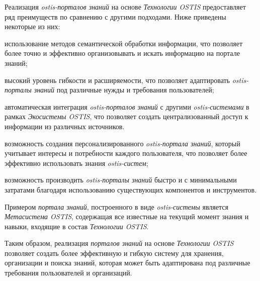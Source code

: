 Реализация \textit{ostis-порталов знаний} на основе \textit{Технологии OSTIS} предоставляет ряд преимуществ по сравнению с другими подходами. Ниже приведены некоторые из них:
\begin{textitemize}
    \item использование методов семантической обработки информации, что позволяет более точно и эффективно организовывать и искать информацию на портале знаний;
    \item высокий уровень гибкости и расширяемости, что позволяет адаптировать \textit{ostis-порталы знаний} под различные нужды и требования пользователей;
    \item автоматическая интеграция \textit{ostis-порталов знаний} с другими \textit{ostis-системами} в рамках \textit{Экосистемы OSTIS}, что позволяет создать централизованный доступ к информации из различных источников.
    \item возможность создания персонализированного \textit{ostis-портала знаний}, который учитывает интересы и потребности каждого пользователя, что позволяет более эффективно использовать знания \textit{ostis-систем};
    \item возможность производить \textit{ostis-порталы знаний} быстро и с минимальными затратами благодаря использованию существующих компонентов и инструментов.
\end{textitemize}

Примером \textit{портала знаний}, построенного в виде \textit{ostis-системы} является \textit{Метасистема OSTIS}, содержащая все известные на текущий момент знания и навыки, входящие в состав \textit{Технологии OSTIS}.

Таким образом, реализация \textit{порталов знаний} на основе \textit{Технологии OSTIS} позволяет создать более эффективную и гибкую систему для хранения, организации и поиска знаний, которая может быть адаптирована под различные требования пользователей и организаций.
